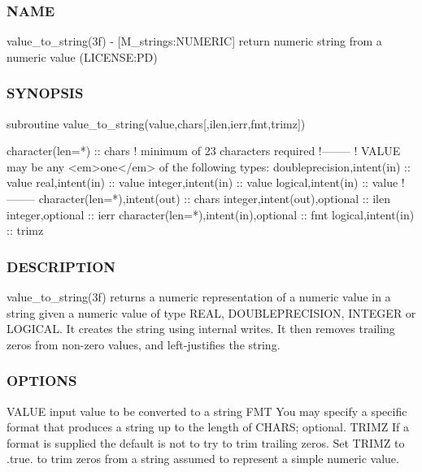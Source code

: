 \subsubsection*{N\+A\+ME}

value\+\_\+to\+\_\+string(3f) -\/ \mbox{[}M\+\_\+strings\+:N\+U\+M\+E\+R\+IC\mbox{]} return numeric string from a numeric value (L\+I\+C\+E\+N\+SE\+:PD) 

\subsubsection*{S\+Y\+N\+O\+P\+S\+IS}

\begin{DoxyVerb}subroutine value_to_string(value,chars[,ilen,ierr,fmt,trimz])

 character(len=*) :: chars  ! minimum of 23 characters required
 !--------
 ! VALUE may be any <em>one</em> of the following types:
 doubleprecision,intent(in)               :: value
 real,intent(in)                          :: value
 integer,intent(in)                       :: value
 logical,intent(in)                       :: value
 !--------
 character(len=*),intent(out)             :: chars
 integer,intent(out),optional             :: ilen
 integer,optional                         :: ierr
 character(len=*),intent(in),optional     :: fmt
 logical,intent(in)                       :: trimz
\end{DoxyVerb}
 \subsubsection*{D\+E\+S\+C\+R\+I\+P\+T\+I\+ON}

value\+\_\+to\+\_\+string(3f) returns a numeric representation of a numeric value in a string given a numeric value of type R\+E\+AL, D\+O\+U\+B\+L\+E\+P\+R\+E\+C\+I\+S\+I\+ON, I\+N\+T\+E\+G\+ER or L\+O\+G\+I\+C\+AL. It creates the string using internal writes. It then removes trailing zeros from non-\/zero values, and left-\/justifies the string.

\subsubsection*{O\+P\+T\+I\+O\+NS}

V\+A\+L\+UE input value to be converted to a string F\+MT You may specify a specific format that produces a string up to the length of C\+H\+A\+RS; optional. T\+R\+I\+MZ If a format is supplied the default is not to try to trim trailing zeros. Set T\+R\+I\+MZ to .true. to trim zeros from a string assumed to represent a simple numeric value.


